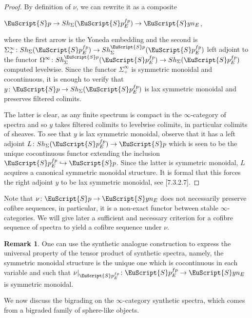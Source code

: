 \documentclass[oneside,a4paper]{amsart}
\newcommand{\euscr}[1]{\EuScript{#1}} %
\newcommand{\spectra}{\euscr{S}p} %
\newcommand{\synspectra}{\euscr{S}yn} %
\newcommand{\sigmainfty}{\Sigma^{\infty}_{+}} %
\newcommand{\omegainfty}{\Omega^{\infty}} %
\theoremstyle{plain}
\theoremstyle{definition}
\newtheorem{rem}[thm]{Remark}
\theoremstyle{remark}
\begin{document}
\begin{proof}
By definition of $\nu$, we can rewrite it as a composite

\begin{center}
$\spectra \rightarrow Sh_{\Sigma}(\spectra_{E}^{fp}) \rightarrow \synspectra_{E}$,
\end{center}
where the first arrow is the Yoneda embedding and the second is $\sigmainfty \colon Sh_{\Sigma}(\spectra_{E}^{fp}) \rightarrow Sh_{\Sigma}^{\spectra}(\spectra_{E}^{fp})$ left adjoint to the functor $\omegainfty \colon Sh_{\Sigma}^{\spectra}(\spectra_{E}^{fp}) \rightarrow Sh_{\Sigma}(\spectra_{E}^{fp})$ computed levelwise. Since the functor $\sigmainfty$ is symmetric monoidal and cocontinuous, it is enough to verify that $y \colon \spectra \rightarrow Sh_{\Sigma}(\spectra_{E}^{fp})$ is lax symmetric monoidal and preserves filtered colimits. 

The latter is clear, as any finite spectrum is compact in the $\infty$-category of spectra and so $y$ takes filtered colimits to levelwise colimits, in particular colimits of sheaves. To see that $y$ is lax symmetric monoidal, observe that it has a left adjoint $L \colon Sh_{\Sigma}(\spectra_{E}^{fp}) \rightarrow \spectra$ which is seen to be the unique cocontinuous functor extending the inclusion $\spectra_{E}^{fp} \hookrightarrow \spectra$. Since the latter is symmetric monoidal, $L$ acquires a canonical symmetric monoidal structure. It is formal that this forces the right adjoint $y$ to be lax symmetric monoidal, see \cite{higher_algebra}[7.3.2.7].
\end{proof}
Note that $\nu \colon \spectra \rightarrow \synspectra_{E}$ does not necessarily preserve cofibre sequences, in particular, it is a non-exact functor between stable $\infty$-categories. We will give later a sufficient and necessary criterion for a cofibre sequence of spectra to yield a cofibre sequence under $\nu$. 

\begin{rem}
\label{rem:universal_property_of_tensor_product_of_synthetic_spectra}
One can use the synthetic analogue construction to express the universal property of the tensor product of synthetic spectra, namely, the symmetric monoidal structure is the unique one which is cocontinuous in each variable and such that $\nu |_{\spectra_{E}^{fp}} \colon \spectra_{E}^{fp} \rightarrow \synspectra_{E}$ is symmetric monoidal. 
\end{rem}

We now discuss the bigrading on the $\infty$-category synthetic spectra, which comes from a bigraded family of sphere-like objects. 
\end{document}
